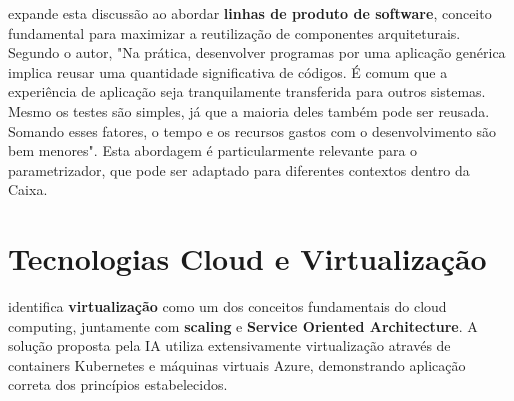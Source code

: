  expande esta discussão ao abordar \textbf{linhas de produto de software}, conceito fundamental para maximizar a reutilização de componentes arquiteturais. Segundo o autor, "Na prática, desenvolver programas por uma aplicação genérica implica reusar uma quantidade significativa de códigos. É comum que a experiência de aplicação seja tranquilamente transferida para outros sistemas. Mesmo os testes são simples, já que a maioria deles também pode ser reusada. Somando esses fatores, o tempo e os recursos gastos com o desenvolvimento são bem menores". Esta abordagem é particularmente relevante para o parametrizador, que pode ser adaptado para diferentes contextos dentro da Caixa.

\section{Tecnologias Cloud e Virtualização}

 identifica \textbf{virtualização} como um dos conceitos fundamentais do cloud computing, juntamente com \textbf{scaling} e \textbf{Service Oriented Architecture}. A solução proposta pela IA utiliza extensivamente virtualização através de containers Kubernetes e máquinas virtuais Azure, demonstrando aplicação correta dos princípios estabelecidos.


